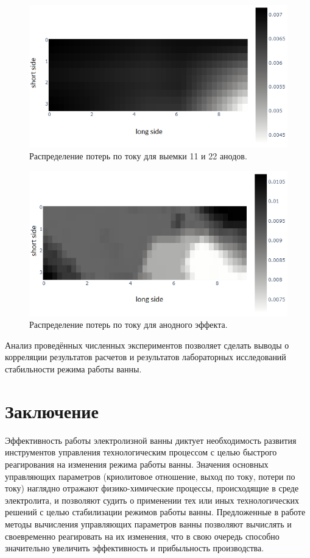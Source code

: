 \documentclass[pdflatex,sn-mathphys-gost]{pmi-jnl}
\begin{document}
\begin{figure}[ht]
    \centering
    \includegraphics[width=\textwidth]{выемка анодов.png}
    \caption{Распределение потерь по току для выемки 11 и 22 анодов.}
    \label{fig:viemkaanodrasp}
\end{figure}

\begin{figure}[ht]
    \centering
    \includegraphics[width=\textwidth]{анодный эффект.png}
    \caption{Распределение потерь по току для анодного эффекта.}
    \label{fig:anodeffectrasp}
\end{figure}

Анализ проведённых численных экспериментов позволяет сделать выводы о корреляции результатов расчетов и результатов лабораторных исследований стабильности режима работы ванны.

\section{Заключение}

Эффективность работы электролизной ванны диктует необходимость развития инструментов управления технологическим процессом с целью быстрого реагирования на изменения режима работы ванны. Значения основных управляющих параметров (криолитовое отношение, выход по току, потери по току) наглядно отражают физико-химические процессы, происходящие в среде электролита, и позволяют судить о применении тех или иных технологических решений с целью стабилизации режимов работы ванны. Предложенные в работе методы вычисления управляющих параметров ванны позволяют вычислять и своевременно реагировать на их изменения, что в свою очередь способно значительно увеличить эффективность и прибыльность производства.
\end{document}
